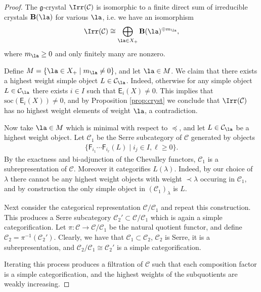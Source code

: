 \documentclass[11pt,reqno]{amsart}
\numberwithin{equation}{section}
\theoremstyle{definition}
\theoremstyle{named}
\newcommand{\bB}{\mathbf{B}}
\newcommand{\cC}{\mathcal{C}}
\newcommand{\sE}{\mathsf{E}}
\newcommand{\sF}{\mathsf{F}}
\newcommand{\fg}{\mathfrak{g}}
\newcommand{\soc}{\mathrm{soc}}
\begin{document}
\begin{proof}
The $\fg$-crystal $\Irr(\cC)$ is isomorphic to a finite direct sum of irreducible crystals $\bB(\la)$ for various $\la$, i.e. we have an isomorphism
$$
\Irr(\cC) \cong \bigoplus_{\la\in X_+} \bB(\la)^{\oplus m_\la},
$$
where $m_\la \geq 0$ and only finitely many are nonzero.

Define $M=\{ \la \in X_+ \;|\; m_\la\neq0\}$, and let $\la \in M$. We claim that there exists a highest weight simple object $L \in \cC_\la$.  Indeed, otherwise for any simple object $L\in \cC_\la$ there exists $i\in I$ such that $\sE_i(X) \neq 0$.  This implies that $\soc(\sE_i(X))\neq 0$, and by Proposition \ref{prop:cryst} we conclude that $\Irr(\cC)$ has no highest weight elements of weight $\la$,  a contradiction.  

Now take $\la \in M$  which is minimal with respect to $\preceq$, and let $L \in \cC_\la$ be a highest weight object.
 Let $\cC_1$ be the Serre subcategory of $\cC$ generated by objects
\begin{align}\label{eq:Serregens}
\{\sF_{i_1}\cdots \sF_{i_\ell}(L)\;|\; i_j\in I, \ell \geq 0\}.
\end{align}
By the exactness and bi-adjunction of the Chevalley functors, $\cC_1$ is  a subrepresentation of $\cC$.  Moreover it categorifies $L(\lambda)$.  Indeed, by our choice of $\lambda$ there cannot be any highest weight objects with weight $\prec\lambda$ occuring in $\cC_1$, and by construction the only simple object in  $(\cC_1)_\lambda$ is $L$.  

Next consider the categorical representation $\cC/\cC_1$ and repeat this construction.  This produces a Serre subcategory $\cC_2' \subset \cC/\cC_1$ which is again a simple categorification.  Let $\pi:\cC \to \cC/\cC_1$ be the natural quotient functor, and define $\cC_2=\pi^{-1}(\cC_2')$.  Clearly, we have that $\cC_1\subset \cC_2$, $\cC_2$ is Serre, it is a subrepresentation, and $\cC_2/\cC_1 \cong \cC_2'$ is a simple categorification.  

Iterating this process produces a filtration of $\cC$ such that each composition factor is a simple categorification, and the highest weights of the subquotients are weakly increasing.
\end{proof}
\end{document}

